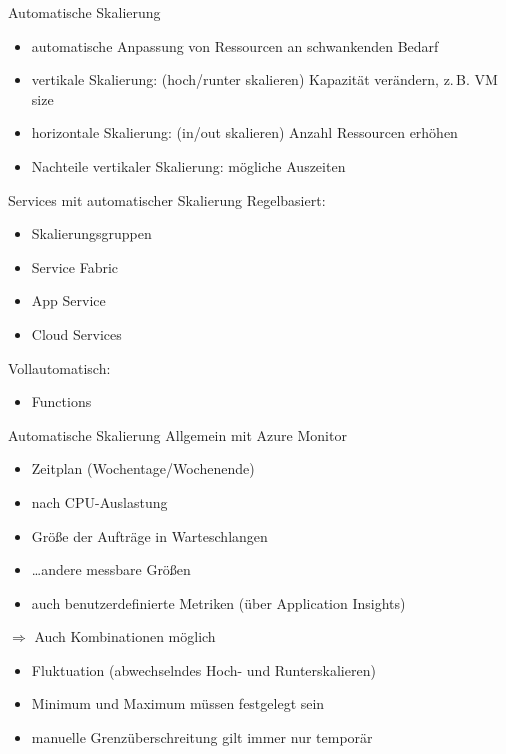 \begin{flashcard}[]{Automatische Skalierung}
  \begin{itemize}
    \item automatische Anpassung von Ressourcen an schwankenden Bedarf
    \item vertikale Skalierung: (hoch/runter skalieren)\newline
      Kapazität verändern, z.\,B. VM size
    \item horizontale Skalierung: (in/out skalieren)\newline
      Anzahl Ressourcen erhöhen
    \item Nachteile vertikaler Skalierung: mögliche Auszeiten
  \end{itemize}
\end{flashcard}

\begin{flashcard}[]{Services mit automatischer Skalierung}
  Regelbasiert:
  \begin{itemize}
    \item Skalierungsgruppen
    \item Service Fabric
    \item App Service
    \item Cloud Services
  \end{itemize}
  Vollautomatisch:
  \begin{itemize}
    \item Functions
  \end{itemize}
\end{flashcard}

\begin{flashcard}[]{Automatische Skalierung}
  Allgemein mit Azure Monitor
  \begin{itemize}
    \item Zeitplan (Wochentage/Wochenende)
    \item nach CPU-Auslastung
    \item Größe der Aufträge in Warteschlangen
    \item \ldots andere messbare Größen
    \item auch benutzerdefinierte Metriken (über Application Insights)
  \end{itemize}
  $\Rightarrow$ Auch Kombinationen möglich
  \begin{itemize}
    \item Fluktuation (abwechselndes Hoch- und Runterskalieren)
    \item Minimum und Maximum müssen festgelegt sein
    \item[!] manuelle Grenzüberschreitung gilt immer nur temporär
  \end{itemize}
  
\end{flashcard}

